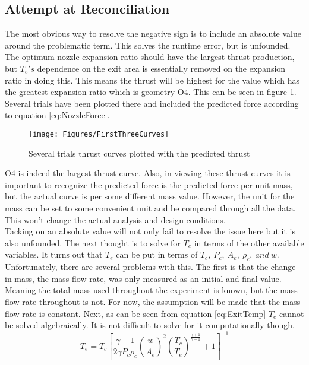 \subsection{Attempt at Reconciliation}
The most obvious way to resolve the negative sign is to include an absolute value around the problematic term. This solves the runtime error, but is unfounded. The optimum nozzle expansion ratio should have the largest thrust production, but  $T_e's$ dependence on the exit area is essentially removed on the expansion ratio in doing this. This means the thrust will be highest for the value which has the greatest expansion ratio which is geometry O4. This can be seen in figure \ref{fig:FirstThreeCurves}. Several trials have been plotted there and included the predicted force according to equation \ref{eq:NozzleForce}.
\begin{figure}[h!]
\centering
\texttt{[image: Figures/FirstThreeCurves]}
\caption{Several trials thrust curves plotted with the predicted thrust}
\label{fig:FirstThreeCurves}
\end{figure}
O4 is indeed the largest thrust curve. Also, in viewing these thrust curves it is important to recognize the predicted force is the predicted force per unit mass, but the actual curve is per some different mass value. However, the unit for the mass can be set to some convenient unit and be compared through all the data. This won't change the actual analysis and design conditions.\\
Tacking on an absolute value will not only fail to resolve the issue here but it is also unfounded. The next thought is to solve for $T_e$ in terms of the other available variables. It turns out that $T_e$ can be put in terms of $T_c,\ P_c,\ A_e,\ \rho_c,\ and\ w$.%
Unfortunately, there are several problems with this. The first is that the change in mass, the mass flow rate, was only measured as an initial and final value. Meaning the total mass used throughout the experiment is known, but the mass flow rate throughout is not. For now, the assumption will be made that the mass flow rate is constant. Next, as can be seen from equation \ref{eq:ExitTemp} $T_e$ cannot be solved algebraically. It is not difficult to solve for it computationally though. 
\begin{equation}\label{eq:ExitTemp}
T_e = T_c\left[\frac{\gamma -1}{2\gamma P_c \rho_c} \left(\frac{w}{A_e}\right)^2\left(\frac{T_c}{T_e}\right)^{\frac{\gamma+1}{\gamma-1}}+1\right]^{-1}
\end{equation}
